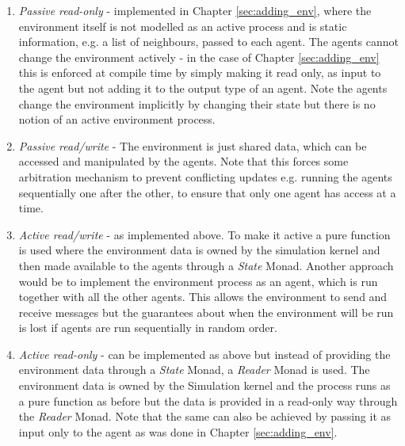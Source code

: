 \begin{enumerate}
	\item \textit{Passive read-only} - implemented in Chapter \ref{sec:adding_env}, where the environment itself is not modelled as an active process and is static information, e.g. a list of neighbours, passed to each agent. The agents cannot change the environment actively - in the case of Chapter \ref{sec:adding_env} this is enforced at compile time by simply making it read only, as input to the agent but not adding it to the output type of an agent. Note the agents change the environment implicitly by changing their state but there is no notion of an active environment process.
	
	\item \textit{Passive read/write} - The environment is just shared data, which can be accessed and manipulated by the agents. Note that this forces some arbitration mechanism to prevent conflicting updates e.g. running the agents sequentially one after the other, to ensure that only one agent has access at a time.
	
	\item \textit{Active read/write} - as implemented above. To make it active a pure function is used where the environment data is owned by the simulation kernel and then made available to the agents through a \textit{State} Monad. Another approach would be to implement the environment process as an agent, which is run together with all the other agents. This allows the environment to send and receive messages but the guarantees about when the environment will be run is lost if agents are run sequentially in random order.
	
	\item \textit{Active read-only} - can be implemented as above but instead of providing the environment data through a \textit{State} Monad, a \textit{Reader} Monad is used. The environment data is owned by the Simulation kernel and the process runs as a pure function as before but the data is provided in a read-only way through the \textit{Reader} Monad. Note that the same can also be achieved by passing it as input only to the agent as was done in Chapter \ref{sec:adding_env}.
\end{enumerate}